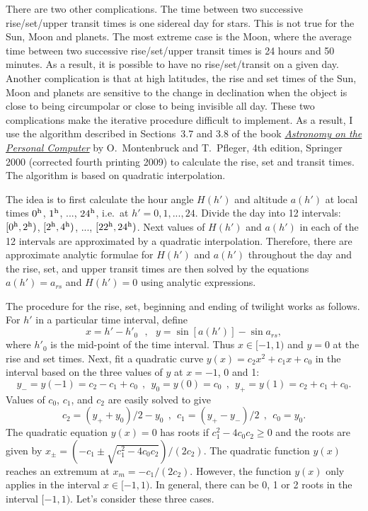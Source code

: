 \documentclass[12pt]{article}
\newcommand \beq {\begin{equation}}
\newcommand \eeq {\end{equation}}
\begin{document}
There are two other complications. The time between two successive 
rise/set/upper transit times is one sidereal day for stars. This is not true 
for the Sun, Moon and planets. The most extreme case is the Moon, where the 
average time between two successive rise/set/upper transit times is 24 hours 
and 50 minutes. As a result, it is possible to have no rise/set/transit on 
a given day. Another complication is that at high latitudes, the rise and set 
times of the Sun, Moon and planets are sensitive to the change in declination 
when the object is close to being circumpolar or close to being invisible all day. 
These two complications make the iterative procedure difficult to implement. As 
a result, I use the algorithm described in Sections~3.7 and 3.8 of the book 
\href{https://www.springer.com/us/book/9783540672210#}{\it Astronomy on the 
Personal Computer} by O.~Montenbruck and T.~Pfleger, 4th edition, Springer 2000 
(corrected fourth printing 2009) to calculate the rise, set and transit times. 
The algorithm is based on quadratic interpolation. 

The idea is to first calculate the hour angle $H(h')$ and altitude $a(h')$ at local times 
$0^{\rm h}$, $1^{\rm h}$, ..., $24^{\rm h}$, i.e.\ at 
$h'=0, 1, ..., 24$. Divide the day into 12 intervals: 
$[0^{\rm h}, 2^{\rm h})$, $[2^{\rm h}, 4^{\rm h})$, ..., $[22^{\rm h}, 24^{\rm h})$. 
Next values of $H(h')$ and $a(h')$ in each of the 12 intervals are approximated by 
a quadratic interpolation. Therefore, there are approximate analytic formulae for $H(h')$ and 
$a(h')$ throughout the day and the rise, set, 
and upper transit times are then solved by the equations $a(h')=a_{rs}$ and $H(h')=0$ 
using analytic expressions. 

The procedure for the rise, set, beginning and ending of twilight works as follows. 
For $h'$ in a particular time interval, define 
\beq
  x = h'-h'_0 \ \ \ , \ \ \ y = \sin [a(h')] - \sin a_{rs} ,
\eeq
where $h'_0$ is the mid-point of the time interval. Thus $x\in [-1,1)$ 
and $y=0$ at the rise and set times. 
Next, fit a quadratic curve $y(x)=c_2 x^2+c_1x+c_0$ in the interval 
based on the three values of $y$ at $x=-1$, 0 and 1: 
\beq
  y_- = y(-1)=c_2-c_1+c_0 \ \ , \ \ y_0=y(0)=c_0 \ \ , \ \ y_+=y(1)=c_2+c_1+c_0 .
\eeq
Values of $c_0$, $c_1$, and $c_2$ are easily solved to give 
\beq
  c_2 = (y_+ + y_0)/2 - y_0 \ \ , \ \ c_1 = (y_+ - y_-)/2  \ \ , \ \  c_0=y_0 .
\eeq
The quadratic equation $y(x)=0$ has roots if $c_1^2-4c_0c_2 \geq 0$ and the 
roots are given by $x_{\pm}=(-c_1\pm \sqrt{c_1^2-4c_0c_2})/(2c_2)$.
The quadratic function $y(x)$ 
reaches an extremum at $x_m=-c_1/(2c_2)$. However, the function $y(x)$ only applies 
in the interval $x\in [-1,1)$. In general, there can be 0, 1 or 2 roots in the interval 
$[-1,1)$. Let's consider these three cases. 
\end{document}
